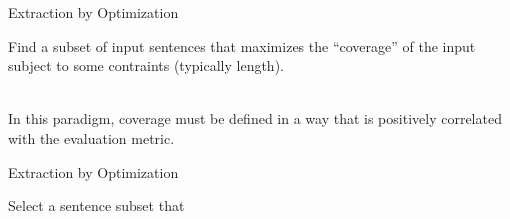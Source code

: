 \documentclass[xcolor={table}]{beamer}
\begin{document}
\begin{frame}{Extraction by Optimization} 

Find a subset of input sentences that maximizes the ``coverage'' of the input
subject to some contraints (typically length).

~\\

In this paradigm, coverage must be defined in a way that is positively 
correlated with the evaluation metric. 

\end{frame}

\begin{frame}[t]{Extraction by Optimization}

    Select a sentence subset that

  \begin{itemize}



\end{itemize}
\end{frame}
\end{document}

